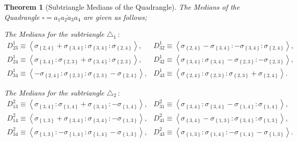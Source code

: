 \documentclass{unswthesis}
\newtheorem{theorem}{Theorem}
\begin{document}
\begin{theorem}[Subtriangle Medians of the Quadrangle]
The Medians of the Quadrangle $\square =\overline{a_{1}a_{2}a_{3}a_{4}}$ are
given as follows;

The Medians for the subtriangle $\triangle _{1}\,:$%
\begin{equation*}
\begin{array}{cc}
D_{23}^{1}\equiv \left\langle \sigma _{\left\{ 2,4\right\} }+\sigma
_{\left\{ 3,4\right\} }:\sigma _{\left\{ 3,4\right\} }:\sigma _{\left\{
2,4\right\} }\right\rangle , & D_{32}^{1}\equiv \left\langle \sigma
_{\left\{ 2,4\right\} }-\sigma _{\left\{ 3,4\right\} }:-\sigma _{\left\{
3,4\right\} }:\sigma _{\left\{ 2,4\right\} }\right\rangle , \\ 
D_{24}^{1}\equiv \left\langle \sigma _{\left\{ 3,4\right\} }:\sigma
_{\left\{ 2,3\right\} }+\sigma _{\left\{ 3,4\right\} }:\sigma _{\left\{
2,3\right\} }\right\rangle , & D_{42}^{1}\equiv \left\langle \sigma
_{\left\{ 3,4\right\} }:\sigma _{\left\{ 3,4\right\} }-\sigma _{\left\{
2,3\right\} }:-\sigma _{\left\{ 2,3\right\} }\right\rangle , \\ 
D_{34}^{1}\equiv \left\langle -\sigma _{\left\{ 2,4\right\} }:\sigma
_{\left\{ 2,3\right\} }:\sigma _{\left\{ 2,3\right\} }-\sigma _{\left\{
2,4\right\} }\right\rangle , & D_{43}^{1}\equiv \left\langle \sigma
_{\left\{ 2,4\right\} }:\sigma _{\left\{ 2,3\right\} }:\sigma _{\left\{
2,3\right\} }+\sigma _{\left\{ 2,4\right\} }\right\rangle .%
\end{array}%
\end{equation*}

The Medians for the subtriangle $\triangle _{2}\,:$%
\begin{equation*}
\begin{array}{cc}
D_{13}^{2}\equiv \left\langle \sigma _{\left\{ 3,4\right\} }:\sigma
_{\left\{ 1,4\right\} }+\sigma _{\left\{ 3,4\right\} }:-\sigma _{\left\{
1,4\right\} }\right\rangle , & D_{31}^{2}\equiv \left\langle \sigma
_{\left\{ 3,4\right\} }:\sigma _{\left\{ 3,4\right\} }-\sigma _{\left\{
1,4\right\} }:\sigma _{\left\{ 1,4\right\} }\right\rangle , \\ 
D_{14}^{2}\equiv \left\langle \sigma _{\left\{ 1,3\right\} }+\sigma
_{\left\{ 3,4\right\} }:\sigma _{\left\{ 3,4\right\} }:-\sigma _{\left\{
1,3\right\} }\right\rangle , & D_{41}^{2}\equiv \left\langle \sigma
_{\left\{ 3,4\right\} }-\sigma _{\left\{ 1,3\right\} }:\sigma _{\left\{
3,4\right\} }:\sigma _{\left\{ 1,3\right\} }\right\rangle , \\ 
D_{34}^{2}\equiv \left\langle \sigma _{\left\{ 1,3\right\} }:-\sigma
_{\left\{ 1,4\right\} }:\sigma _{\left\{ 1,4\right\} }-\sigma _{\left\{
1,3\right\} }\right\rangle , & D_{43}^{2}\equiv \left\langle \sigma
_{\left\{ 1,3\right\} }:\sigma _{\left\{ 1,4\right\} }:-\sigma _{\left\{
1,4\right\} }-\sigma _{\left\{ 1,3\right\} }\right\rangle .%
\end{array}%
\end{equation*}


\end{theorem}
\end{document}
